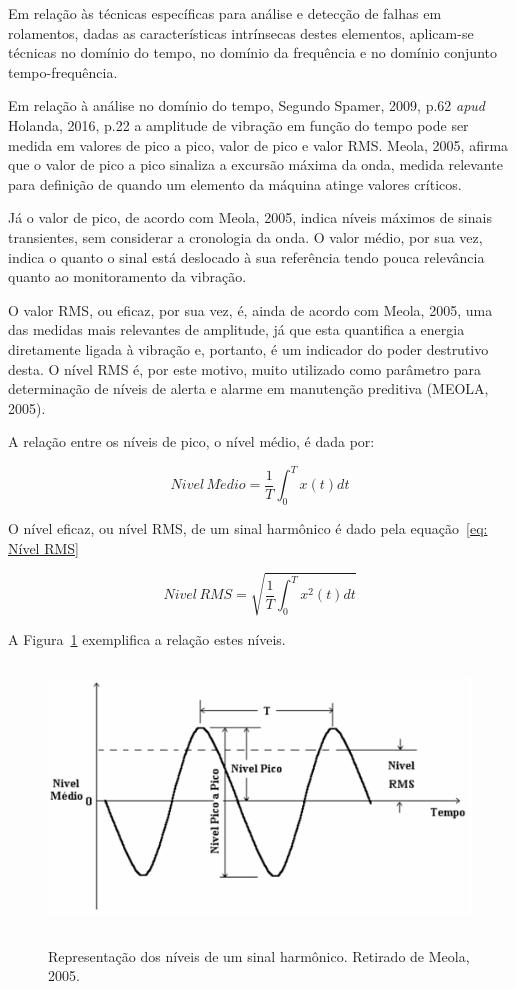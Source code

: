 \documentclass[
	12pt,				
	oneside,			
	a4paper,			
	english,			
	brazil,			
	]{abntex2ppgsi}
\begin{document}
Em relação às técnicas específicas para análise e detecção de falhas em rolamentos, dadas as características intrínsecas destes elementos, aplicam-se técnicas no domínio do tempo, no domínio da frequência e no domínio conjunto tempo-frequência. 

Em relação à análise no domínio do tempo, Segundo Spamer, 2009, p.62 \textit{apud} Holanda, 2016, p.22 a amplitude de vibração em função do tempo pode ser medida em valores de pico a pico, valor de pico e valor RMS. Meola, 2005, afirma que o valor de pico a pico sinaliza a excursão máxima da onda, medida relevante para definição de quando um elemento da máquina atinge valores críticos. 

Já o valor de pico, de acordo com Meola, 2005, indica níveis máximos de sinais transientes, sem considerar a cronologia da onda. O valor médio, por sua vez, indica o quanto o sinal está deslocado à sua referência tendo pouca relevância quanto ao monitoramento da vibração. 

O valor RMS, ou eficaz, por sua vez, é, ainda de acordo com Meola, 2005, uma das medidas mais relevantes de amplitude, já que esta quantifica a energia diretamente ligada à vibração e, portanto, é um indicador do poder destrutivo desta. O nível RMS é, por este motivo, muito utilizado como parâmetro para determinação de níveis de alerta e alarme em manutenção preditiva (MEOLA, 2005).

A relação entre os níveis de pico, o nível médio, é dada por:

\begin{equation}
	Nivel \, M\acute{e}dio = \frac{1}{T} \int_{0}^{T} x(t)dt
	\label{eq: Nível Médio}
\end{equation}

O nível eficaz, ou nível RMS, de um sinal harmônico é dado pela equação~\ref{eq: Nível RMS}

\begin{equation}
	Nivel \, RMS = \sqrt{ \frac{1}{T} \int_{0}^{T} x^{2}(t)dt }
	\label{eq: Nível RMS}
\end{equation}

A Figura~\ref{RelacaoSinalHarmonico} exemplifica a relação estes níveis.

\begin{figure}[!htb]
\centering
\caption {Representação dos níveis de um sinal harmônico. Retirado de Meola, 2005.}
\includegraphics[width=\textwidth,height=70mm,keepaspectratio]{Figura17}
\label{RelacaoSinalHarmonico}
\end{figure}
\end{document}
